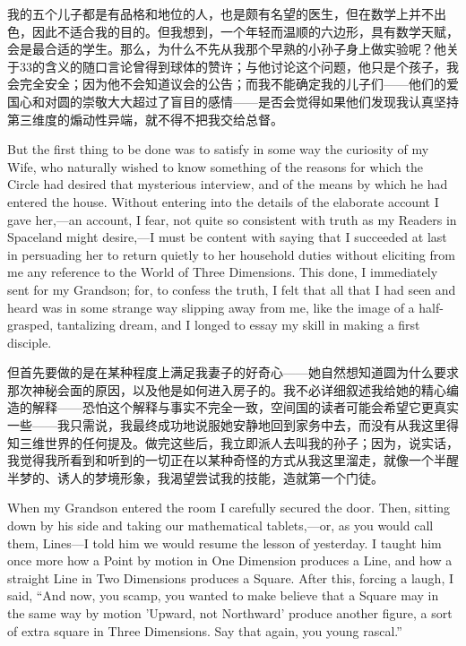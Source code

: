 \documentclass[12pt,UTF8]{ctexbook}
\begin{document}
我的五个儿子都是有品格和地位的人，也是颇有名望的医生，但在数学上并不出色，因此不适合我的目的。但我想到，一个年轻而温顺的六边形，具有数学天赋，会是最合适的学生。那么，为什么不先从我那个早熟的小孙子身上做实验呢？他关于33的含义的随口言论曾得到球体的赞许；与他讨论这个问题，他只是个孩子，我会完全安全；因为他不会知道议会的公告；而我不能确定我的儿子们——他们的爱国心和对圆的崇敬大大超过了盲目的感情——是否会觉得如果他们发现我认真坚持第三维度的煽动性异端，就不得不把我交给总督。

But the first thing to be done was to satisfy in some way the curiosity of my Wife, who naturally wished to know something of the reasons for which the Circle had desired that mysterious interview, and of the means by which he had entered the house. Without entering into the details of the elaborate account I gave her,---an account, I fear, not quite so consistent with truth as my Readers in Spaceland might desire,---I must be content with saying that I succeeded at last in persuading her to return quietly to her household duties without eliciting from me any reference to the World of Three Dimensions. This done, I immediately sent for my Grandson; for, to confess the truth, I felt that all that I had seen and heard was in some strange way slipping away from me, like the image of a half-grasped, tantalizing dream, and I longed to essay my skill in making a first disciple.

但首先要做的是在某种程度上满足我妻子的好奇心——她自然想知道圆为什么要求那次神秘会面的原因，以及他是如何进入房子的。我不必详细叙述我给她的精心编造的解释——恐怕这个解释与事实不完全一致，空间国的读者可能会希望它更真实一些——我只需说，我最终成功地说服她安静地回到家务中去，而没有从我这里得知三维世界的任何提及。做完这些后，我立即派人去叫我的孙子；因为，说实话，我觉得我所看到和听到的一切正在以某种奇怪的方式从我这里溜走，就像一个半醒半梦的、诱人的梦境形象，我渴望尝试我的技能，造就第一个门徒。

When my Grandson entered the room I carefully secured the door. Then, sitting down by his side and taking our mathematical tablets,---or, as you would call them, Lines---I told him we would resume the lesson of yesterday. I taught him once more how a Point by motion in One Dimension produces a Line, and how a straight Line in Two Dimensions produces a Square. After this, forcing a laugh, I said, ``And now, you scamp, you wanted to make believe that a Square may in the same way by motion 'Upward, not Northward' produce another figure, a sort of extra square in Three Dimensions. Say that again, you young rascal.''
\end{document}
